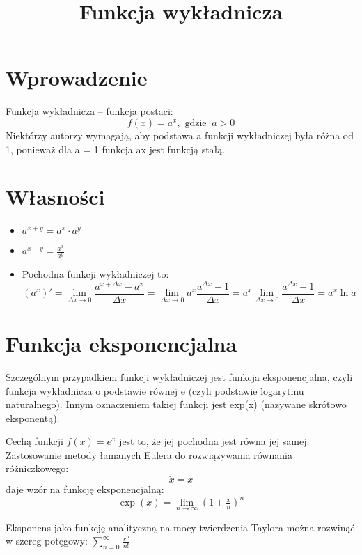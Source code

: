 \documentclass{article}
\begin{document}
\title{Funkcja wykładnicza}
\maketitle

\section*{Wprowadzenie}
Funkcja wykładnicza – funkcja postaci:
$$  f(x)=a^{x}, {\text{ gdzie }} \: a>0 $$
Niektórzy autorzy wymagają, aby podstawa a funkcji wykładniczej była różna od 1, ponieważ dla  a = 1 funkcja  ax jest funkcją stałą. 

\section*{Własności}
\begin{itemize}
\item $ a^{x+y}=a^{x}\cdot a^{y} $
\item \begin{math} a^{x-y}={\frac {a^{x}}{a^{y}}} \end{math}
\item Pochodna funkcji wykładniczej to:
\begin{displaymath}
(a^{x})'=\lim _{\Delta x\to 0}{\frac {a^{x+\Delta x}-a^{x}}{\Delta x}}=\lim _{\Delta x\to 0}a^{x}{\frac {a^{\Delta x}-1}{\Delta x}}=a^{x}\lim _{\Delta x\to 0}{\frac {a^{\Delta x}-1}{\Delta x}}=a^{x}\ln a
\end{displaymath}
\end{itemize}

\section*{Funkcja eksponencjalna}
Szczególnym przypadkiem funkcji wykładniczej jest funkcja eksponencjalna, czyli funkcja wykładnicza o podstawie równej e (czyli podstawie logarytmu naturalnego). Innym oznaczeniem takiej funkcji jest exp(x) (nazywane skrótowo eksponentą). 

Cechą funkcji $ f(x)=e^{x} $ jest to, że jej pochodna jest równa jej samej. Zastosowanie metody łamanych Eulera do rozwiązywania równania różniczkowego: 
\begin{equation*}
{\dot  {x}}=x
\end{equation*}
daje wzór na funkcję eksponencjalną: 
$$ \exp(x)=\lim _{n\to \infty }\left(1+{\tfrac {x}{n}}\right)^{n} $$

Eksponens jako funkcję analityczną na mocy twierdzenia Taylora można rozwinąć w szereg potęgowy: \( \sum _{n=0}^{\infty }{\frac {x^{n}}{n!}} \)
\end{document}
